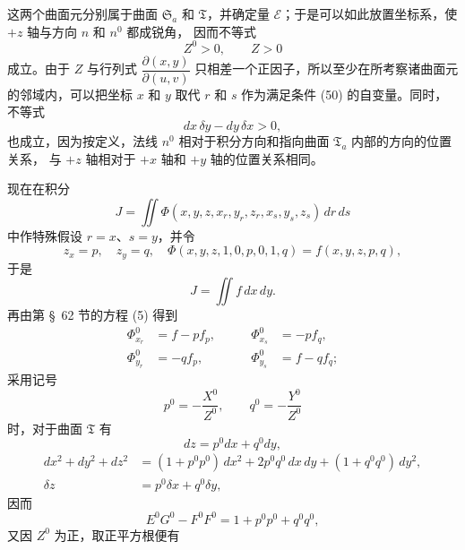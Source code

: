 \documentclass[11pt,a4paper,leqno]{article}
\begin{document}
这两个曲面元分别属于曲面 $\mathfrak{S}_a$ 和 $\mathfrak{T}$，并确定量
$\mathcal{E}$；于是可以如此放置坐标系，使 $+z$ 轴与方向 $n$ 和 $n^0$ 都成锐角，
因而不等式
\[
Z^0>0,\qquad Z>0
\]
成立。由于 $Z$ 与行列式 $\dfrac{\partial(x,y)}{\partial(u,v)}$
只相差一个正因子，所以至少在所考察诸曲面元的邻域内，可以把坐标 $x$ 和 $y$ 取代 $r$ 和 $s$
作为满足条件 (50) 的自变量。同时，不等式
\begin{equation}\tag{51}
dx\,\delta y-dy\,\delta x>0,
\end{equation}
也成立，因为按定义，法线 $n^0$ 相对于积分方向和指向曲面 $\mathfrak{T}_a$ 内部的方向的位置关系，
与 $+z$ 轴相对于 $+x$ 轴和 $+y$ 轴的位置关系相同。

现在在积分
\[
J=\iint\Phi(x,y,z,x_r,y_r,z_r,x_s,y_s,z_s)\,dr\,ds
\]
中作特殊假设 $r=x$、$s=y$，并令
\[
z_x=p,\quad z_y=q,\quad
\Phi(x,y,z,1,0,p,0,1,q)=f(x,y,z,p,q),
\]
于是
\[
J=\iint f\,dx\,dy.
\]
再由第 \S~62 节的方程 (5) 得到
\[
\begin{aligned}
\Phi^0_{x_r}&=f-pf_p,&\qquad \Phi^0_{x_s}&=-pf_q,\\
\Phi^0_{y_r}&=-qf_p,&\qquad \Phi^0_{y_s}&=f-qf_q;
\end{aligned}
\]
采用记号
\[
p^0=-\frac{X^0}{Z^0},\qquad q^0=-\frac{Y^0}{Z^0}
\]
时，对于曲面 $\mathfrak{T}$ 有
\[
dz=p^0dx+q^0dy,
\]
\[
\begin{aligned}
dx^2+dy^2+dz^2
&=(1+p^0p^0)\,dx^2+2p^0q^0\,dx\,dy+(1+q^0q^0)\,dy^2,\\
\delta z&=p^0\delta x+q^0\delta y,
\end{aligned}
\]
因而
\[
E^0G^0-F^0F^0=1+p^0p^0+q^0q^0,
\]
又因 $Z^0$ 为正，取正平方根便有
\end{document}
